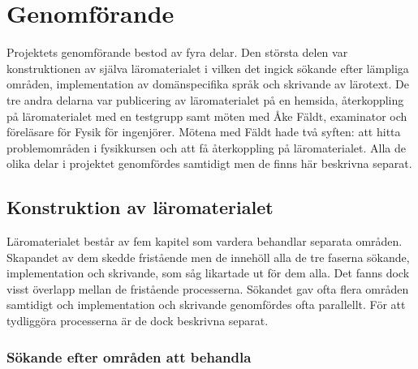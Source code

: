 



\chapter{Genomförande}

Projektets genomförande bestod av fyra delar. Den största delen var
konstruktionen av själva läromaterialet i vilken det ingick sökande efter lämpliga
områden, implementation av domänspecifika språk och skrivande av lärotext. De
tre andra delarna var publicering av läromaterialet på en hemsida, återkoppling på
läromaterialet med en testgrupp samt möten med Åke Fäldt, examinator och
föreläsare för Fysik för ingenjörer. Mötena med Fäldt hade två syften: att hitta
problemområden i fysikkursen och att få återkoppling på läromaterialet. Alla de
olika delar i projektet genomfördes samtidigt men de finns här beskrivna
separat.

\section{Konstruktion av läromaterialet}\label{sec:konstruktion}

Läromaterialet består av fem kapitel som vardera behandlar separata områden.
Skapandet av dem skedde fristående men de innehöll alla de tre faserna sökande,
implementation och skrivande, som såg likartade ut för dem alla. Det fanns dock
visst överlapp mellan de fristående processerna. Sökandet gav ofta flera områden
samtidigt och implementation och skrivande genomfördes ofta parallellt. För att
tydliggöra processerna är de dock beskrivna separat.

\subsection{Sökande efter områden att behandla}\label{sec:valet}

